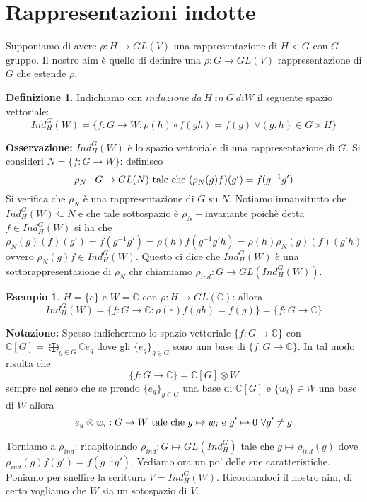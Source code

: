 \documentclass[11pt]{article}
\theoremstyle{plain}
\theoremstyle{definition}
\newtheorem{defn}{Definizione}[section]
\newtheorem{exmp}{Esempio}[section]
\theoremstyle{remark}
\newcommand{\C}{\mathbb{C}}
\begin{document}
\newpage
\section{Rappresentazioni indotte}
Supponiamo di avere $\rho:H\rightarrow GL(V)$ una rappresentazione di $H<G$ con $G$ gruppo. Il nostro aim è quello di definire una $\widetilde{\rho}:G\rightarrow GL(V)$ rappresentazione di $G$ che estende $\rho$.

\begin{defn}Indichiamo con $induzione\ da\ H\ in \ G\ di W$ il seguente spazio vettoriale:
\[Ind_H^G(W)=\{f:G\rightarrow W: \rho(h)\circ f(gh)=f(g)\ \forall (g,h)\in G\times H\}   \]
\end{defn}

\textbf{Osservazione:} $Ind_H^G(W)$ è lo spazio vettoriale di una rappresentazione di $G$.
Si consideri $N=\{f:G\rightarrow W\}$: definisco
\[\rho_N:G\rightarrow GL(N) \textup{ tale che }(\rho_N(g)f)(g')=f(g^{-1}g')\]
Si verifica che $\rho_N$ è una rappresentazione di $G$ su $N$. Notiamo innanzitutto che $Ind_H^G(W)\subseteq N$ e che tale sottospazio è $\rho_N-$invariante poichè detta $f\in Ind_H^G(W)$ si ha che
\[ \rho_N(g)(f)(g')=f(g^{-1}g')=\rho(h)f(g^{-1}g'h)=\rho(h)\rho_N(g)(f)(g'h)\]
ovvero $\rho_N(g)f\in Ind_H^G(W)$. Questo ci dice che $Ind_H^G(W)$ è una sottorappresentazione di $\rho_N$ chr chiamiamo $\rho_{ind}:G\rightarrow GL(Ind_H^G(W))$.

\begin{exmp}
$H=\{e\}$ e $W=\C$ con $\rho:H\rightarrow GL(\C)$: allora
\[Ind_H^G(W)=\{f:G\rightarrow \C:\rho(e)f(gh)=f(g)\}=\{f:G\rightarrow \C\}\]
\end{exmp}

\textbf{Notazione:} Spesso indicheremo lo spazio vettoriale $\{f:G\rightarrow \C\}$ con $\C[G]=\bigoplus_{g\in G}\C e_g$ dove gli $\{e_g\}_{g\in G}$ sono una base di $\{f:G\rightarrow \C\}$. 
In tal modo risulta che 
\[\{f:G\rightarrow \C\}=\C[G]\otimes W\]
sempre nel senso che se prendo $\{e_g\}_{g\in G}$ una base di $\C[G]$ e $\{w_i\}\in W$ una base di $W$ allora 
\[e_g\otimes w_i:G\rightarrow W \textup{ tale che } g\mapsto w_i \textup{ e } g'\mapsto 0\ \forall g'\neq g\]

Torniamo a $\rho_{ind}$: ricapitolando $\rho_{ind}:G\mapsto GL(Ind_H^G)$ tale che $g\mapsto \rho_{ind}(g)$ dove $\rho_{ind}(g)f(g')=f(g^{-1}g')$. Vediamo ora un po' delle sue caratteristiche. Poniamo per snellire la scrittura $V=Ind_H^G(W)$. Ricordandoci il nostro aim, di certo vogliamo che $W$ sia un sotospazio di $V$.
\end{document}
